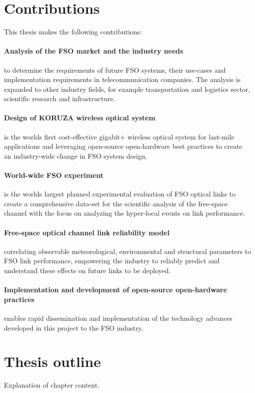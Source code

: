 \section{Contributions}
This thesis makes the following contributions:

\paragraph{Analysis of the FSO market and the industry needs} to determine the requirements of future FSO systems, their use-cases and implementation requirements in telecommunication companies. The analysis is expanded to other industry fields, for example transportation and logistics sector, scientific research and infrastructure. 

\paragraph{Design of KORUZA wireless optical system} is the worlds first cost-effective gigabit+ wireless optical system for last-mile applications and leveraging open-source open-hardware best practices to create an industry-wide change in FSO system design.

\paragraph{World-wide FSO experiment} is the worlds largest planned experimental evaluation of FSO optical links to create a comprehensive data-set for the scientific analysis of the free-space channel with the focus on analyzing the hyper-local events on link performance.

\paragraph{Free-space optical channel link reliability model} correlating observable meteorological, environmental and structural parameters to FSO link performance, empowering the industry to reliably predict and understand these effects on future links to be deployed.

\paragraph{Implementation and development of open-source open-hardware practices} enables rapid dissemination and implementation of the technology advances developed in this project to the FSO industry.

\section{Thesis outline}
Explanation of chapter content. 

\blindtext
